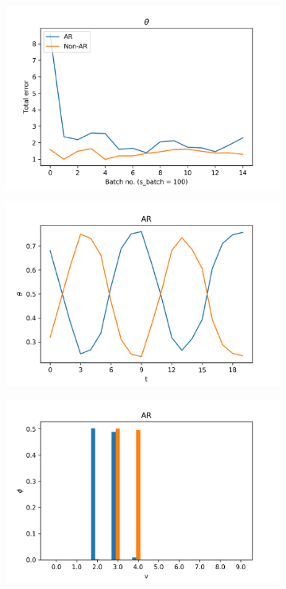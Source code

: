 \documentclass[12pt]{article}
\begin{document}
\begin{figure}[H]
  \centering
  \begin{subfigure}[b]{0.3\textwidth}
    \includegraphics[width=\linewidth]{performance_thetas_experiment-1|overlapping-yes_dataset-4.png}
  \end{subfigure}%
  \begin{subfigure}[b]{0.3\textwidth}
    \includegraphics[width=\linewidth]{latent_thetas_AR_experiment-1|overlapping-yes_dataset-4.png}
  \end{subfigure}%
  \begin{subfigure}[b]{0.3\textwidth}
    \includegraphics[width=\linewidth]{latent_phis_AR_experiment-1|overlapping-yes_dataset-4.png}
  \end{subfigure}%


\end{figure}
\end{document}
